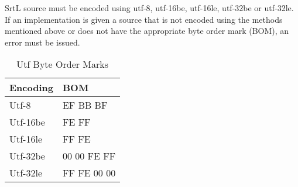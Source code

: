 SrtL source must be encoded using utf-8, utf-16be, utf-16le, utf-32be or
utf-32le. If an implementation is given a source that is not encoded using the 
methods mentioned above or does not have the appropriate byte order mark (BOM), 
an error must be issued. 

\begin{table}[h]
    \centering
    \caption{Utf Byte Order Marks}
    \begin{tabular}{|l|l|}
        \hline
        \textbf{Encoding}   & \textbf{BOM} \\ \hline
        Utf-8               & EF BB BF     \\ \hline
        Utf-16be            & FE FF        \\ \hline
        Utf-16le            & FF FE        \\ \hline
        Utf-32be            & 00 00 FE FF  \\ \hline
        Utf-32le            & FF FE 00 00  \\ \hline
    \end{tabular}
\end{table}